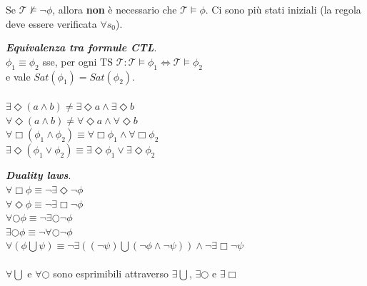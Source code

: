 \documentclass[a4paper, notitlepage, 9pt]{extreport}
\begin{document}
\noindent
Se $\mathcal{T} \nvDash \lnot \phi$, allora \textbf{non} è necessario che $\mathcal{T} \vDash \phi$. Ci sono più stati iniziali (la regola deve essere verificata $\forall s_0$).
\begin{multicols}{2}
	\noindent
\textit{\textbf{Equivalenza tra formule CTL}}.\\
$\phi_1 \equiv \phi_2$ sse, per ogni TS $\mathcal{T}: \mathcal{T} \vDash \phi_1 \Leftrightarrow \mathcal{T} \vDash \phi_2$\\e vale $Sat(\phi_1) = Sat(\phi_2)$.\\\\
$\exists \Diamond (a \land b) \neq \exists \Diamond a \land \exists \Diamond b$\\
$\forall \Diamond (a \land b) \neq \forall \Diamond a \land \forall \Diamond b$\\
$\forall \Box (\phi_1 \land \phi_2) \equiv \forall \Box \phi_1 \land \forall \Box \phi_2$\\
$\exists \Diamond (\phi_1 \lor \phi_2) \equiv \exists \Diamond \phi_1 \lor \exists \Diamond \phi_2$
\columnbreak

\noindent
\textit{\textbf{Duality laws}}.\\
$\forall \Box \phi \equiv \lnot \exists \Diamond \lnot \phi$\\
$\forall \Diamond \phi \equiv \lnot \exists \Box \lnot \phi$\\
$\forall \bigcirc \phi \equiv \lnot \exists \bigcirc \lnot \phi$\\
$\exists \bigcirc \phi \equiv \lnot \forall \bigcirc \lnot \phi$\\
$\forall(\phi \bigcup \psi) \equiv \lnot \exists ((\lnot \psi) \bigcup (\lnot \phi \land \lnot \psi)) \land \lnot \exists \Box \lnot \psi$\\
\\
$\forall \bigcup$ e $\forall \bigcirc$ sono esprimibili attraverso $\exists \bigcup$, $\exists \bigcirc$ e $\exists \Box$
\end{multicols}
\end{document}
